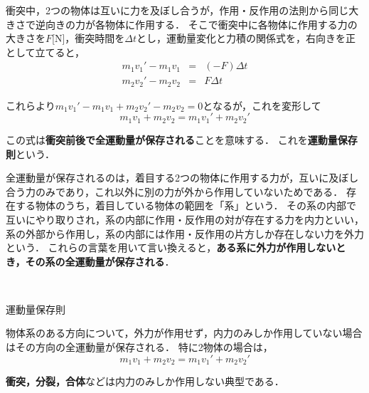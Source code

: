 衝突中，2つの物体は互いに力を及ぼし合うが，作用・反作用の法則から同じ大きさで逆向きの力が各物体に作用する．
そこで衝突中に各物体に作用する力の大きさを$F$[N]，衝突時間を$\Delta t$とし，運動量変化と力積の関係式を，右向きを正として立てると，
\begin{eqnarray*}
m_1v_1'-m_1v_1&=&(-F)\Delta t\\
m_2v_2'-m_2v_2&=&F\Delta t
\end{eqnarray*}

これらより$m_1v_1'-m_1v_1+m_2v_2'-m_2v_2=0$となるが，これを変形して
\[ m_1v_1+m_2v_2=m_1v_1'+m_2v_2' \]

この式は{\bf 衝突前後で全運動量が保存される}ことを意味する．
これを{\bf 運動量保存則}という．

全運動量が保存されるのは，着目する2つの物体に作用する力が，互いに及ぼし合う力のみであり，これ以外に別の力が外から作用していないためである．
存在する物体のうち，着目している物体の範囲を「系」という．
その系の内部で互いにやり取りされ，系の内部に作用・反作用の対が存在する力を内力といい，系の外部から作用し，系の内部には作用・反作用の片方しか存在しない力を外力という．
これらの言葉を用いて言い換えると，{\bf ある系に外力が作用しないとき，その系の全運動量が保存される}．

 \ 
 
\begin{matome}{運動量保存則}

\hspace{5mm}物体系のある方向について，外力が作用せず，内力のみしか作用していない場合はその方向の全運動量が保存される．
特に2物体の場合は，
\[m_1v_1+m_2v_2=m_1v_1'+m_2v_2'\]
 \end{matome}


 
 {\bf 衝突，分裂，合体}などは内力のみしか作用しない典型である．

%


